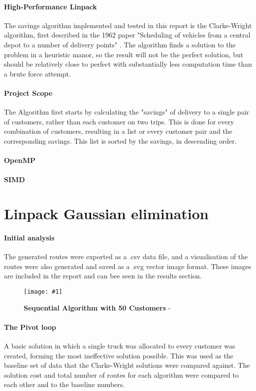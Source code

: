 \documentclass[conference]{acmsiggraph}
\newcommand{\figuremacroW}[4]{
	\begin{figure}[h] %
		\centering
		\texttt{[image: \#1]}
		\caption[#2]{\textbf{#2} - #3}
		\label{fig:#1}
	\end{figure}
}
\begin{document}
\paragraph{High-Performance Linpack}
The savings algorithm implemented and tested in this report is the Clarke-Wright algorithm, first described in the 1962 paper "Scheduling of vehicles from a central depot to a number of delivery points" \cite{CW}.
The algorithm finds a solution to the problem in a heuristic manor, so the result will not be the perfect solution, but should be relatively close to perfect with substantially less computation time than a brute force attempt. 

\paragraph{Project Scope}
The Algorithm first starts by calculating the "savings" of delivery to a single pair of customers, rather than each customer on two trips. This is done for every combination of customers, resulting in a list or every customer pair and the corresponding savings. This list is sorted by the savings, in descending order.

\paragraph{OpenMP}

\paragraph{SIMD}

\section{Linpack Gaussian elimination}

\paragraph{Initial analysis}
The generated routes were exported as a .csv data file, and a visualisation of the routes were also generated and saved as a .svg vector image format. These images are included in the report and can bee seen in the results section.

\figuremacroW
{linpackmat}
{Sequential Algorithm with 50 Customers}
{}
{0.75}


\paragraph{The Pivot loop}
A basic solution in which a single truck was allocated to every customer was created, forming the most ineffective solution possible. This was used as the baseline set of data that the Clarke-Wright solutions were compared against. The solution cost and total number of routes for each algorithm were compared to each other and to the baseline numbers.
\end{document}
